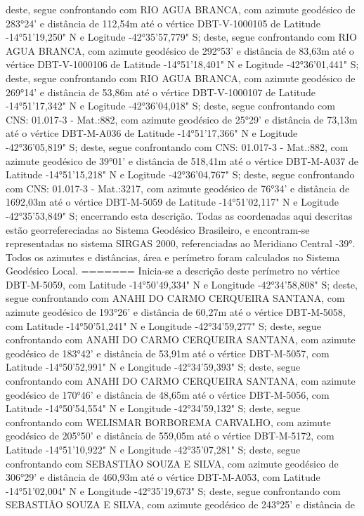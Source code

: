 deste, segue confrontando com RIO AGUA BRANCA, com azimute geodésico de 283°24' e distância de 
112,54m até o vértice DBT-V-1000105 de Latitude -14°51'19,250" N e Logitude -42°35'57,779" S;
deste, segue confrontando com RIO AGUA BRANCA, com azimute geodésico de 292°53' e distância de 
83,63m até o vértice DBT-V-1000106 de Latitude -14°51'18,401" N e Logitude -42°36'01,441" S;
deste, segue confrontando com RIO AGUA BRANCA, com azimute geodésico de 269°14' e distância de 
53,86m até o vértice DBT-V-1000107 de Latitude -14°51'17,342" N e Logitude -42°36'04,018" S;
deste, segue confrontando com CNS: 01.017-3 - Mat.:882, com azimute geodésico de 25°29' e distância de 
73,13m até o vértice DBT-M-A036 de Latitude -14°51'17,366" N e Logitude -42°36'05,819" S;
deste, segue confrontando com CNS: 01.017-3 - Mat.:882, com azimute geodésico de 39°01' e distância de 
518,41m até o vértice DBT-M-A037 de Latitude -14°51'15,218" N e Logitude -42°36'04,767" S;
deste, segue confrontando com CNS: 01.017-3 - Mat.:3217, com azimute geodésico de 76°34' e distância de 
1692,03m até o vértice DBT-M-5059 de Latitude -14°51'02,117" N e Logitude -42°35'53,849" S;
 encerrando esta descrição. Todas as coordenadas aqui descritas estão georrefereciadas ao Sistema 
Geodésico Brasileiro, e encontram-se representadas no sistema SIRGAS 2000, referenciadas ao Meridiano Central -39°.
 Todos os azimutes e distâncias, área e perímetro foram calculados no Sistema Geodésico Local.
=======
Inicia-se a descrição deste perímetro no vértice DBT-M-5059, com Latitude -14°50'49,334" N e Longitude -42°34'58,808" S; deste, segue confrontando com ANAHI DO CARMO CERQUEIRA SANTANA, com azimute geodésico de 193°26' e distância de 60,27m até o vértice DBT-M-5058, com Latitude -14°50'51,241" N e Longitude -42°34'59,277" S; deste, segue confrontando com ANAHI DO CARMO CERQUEIRA SANTANA, com azimute geodésico de 183°42' e distância de 
53,91m  até o vértice DBT-M-5057, com Latitude -14°50'52,991" N e Longitude -42°34'59,393" S; deste, segue confrontando com ANAHI DO CARMO CERQUEIRA SANTANA, com azimute geodésico de 170°46' e distância de 
48,65m  até o vértice DBT-M-5056, com Latitude -14°50'54,554" N e Longitude -42°34'59,132" S; deste, segue confrontando com WELISMAR BORBOREMA CARVALHO, com azimute geodésico de 205°50' e distância de 
559,05m  até o vértice DBT-M-5172, com Latitude -14°51'10,922" N e Longitude -42°35'07,281" S; deste, segue confrontando com SEBASTIÃO SOUZA E SILVA, com azimute geodésico de 306°29' e distância de 
460,93m  até o vértice DBT-M-A053, com Latitude -14°51'02,004" N e Longitude -42°35'19,673" S; deste, segue confrontando com SEBASTIÃO SOUZA E SILVA, com azimute geodésico de 243°25' e distância de 
